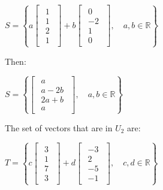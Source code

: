 \singlespacing

\begin{math}
    S=\left\{
    a\begin{bmatrix}
        \begin{array}{c}
            1 \\
            1 \\
            2 \\
            1
        \end{array}
    \end{bmatrix}+
    b\begin{bmatrix}
        \begin{array}{c}
            0  \\
            -2 \\
            1  \\
            0
        \end{array}
    \end{bmatrix},\quad a,b \in \mathbb{R}\right\}
\end{math}

\singlespacing

Then:

\singlespacing

\begin{math}
    S=\left\{
    \begin{bmatrix}
        \begin{array}{c}
            a    \\
            a-2b \\
            2a+b \\
            a
        \end{array}
    \end{bmatrix},\quad a,b \in \mathbb{R}\right\}
\end{math}

\singlespacing

The set of vectors that are in $U_2$ are:

\singlespacing

\begin{math}
    T=\left\{
    c\begin{bmatrix}
        \begin{array}{c}
            3 \\
            1 \\
            7 \\
            3
        \end{array}
    \end{bmatrix}+
    d\begin{bmatrix}
        \begin{array}{c}
            -3 \\
            2  \\
            -5 \\
            -1
        \end{array}
    \end{bmatrix},\quad c,d \in \mathbb{R}\right\}
\end{math}

